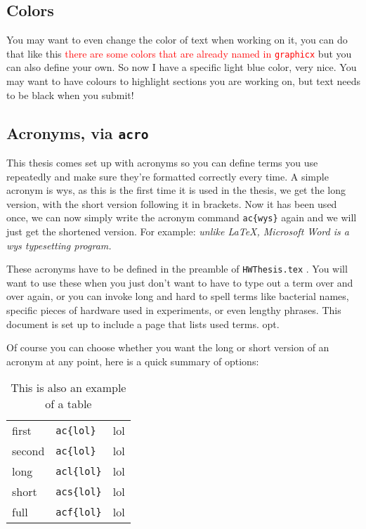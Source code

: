 \documentclass[../HWThesis.tex]{subfiles} %
\begin{document}
\begin{refsection}
\subsection{Colors}
You may want to even change the color of text when working on it, you can do that like this \textcolor{red}{there are some colors that are already named in \texttt{graphicx}} but you can also define your own.   \textcolor{light-blue}{So now I have a specific light blue color, very nice.} You may want to have colours to highlight sections you are working on, but text needs to be black when you submit!

\subsection{Acronyms, via \texttt{acro}}

This thesis comes set up with acronyms so you can define terms you use repeatedly and make sure they're formatted correctly every time. A simple acronym is  \ac{wys}, as this is the first time it is used in the thesis, we get the long version, with the short version following it in brackets. Now it has been used once, we can now simply write the acronym command \texttt{ac\{wys\}} again and we will just get the shortened version. For example:  \textit{unlike \LaTeX, Microsoft Word is a \ac{wys} typesetting program. }

These acronyms have to be defined in the preamble of \texttt{HWThesis.tex} . You will want to use these when you just don't want to have to type out a term over and over again, or you can invoke long and hard to spell terms like bacterial names, specific pieces of hardware used in experiments, or even lengthy phrases. This document is set up to include a page that lists used terms. \acl{opt}. 

Of course you can choose whether you want the long or short version of an acronym at any point, here is a quick summary of options: 
\begin{table}[H]
\begin{tabular}{lll}
first &  \texttt{ac\{lol\}} & \ac{lol} \\
second & \texttt{ac\{lol\}}& \ac{lol} \\
long & \texttt{acl\{lol\}}  & \acl{lol} \\
short & \texttt{acs\{lol\}} & \acs{lol} \\
full & \texttt{acf\{lol\}}  & \acf{lol}
\end{tabular}
\caption{This is also an example of a table}
\label{tab: example table}
\end{table}


\end{refsection}
\end{document}

